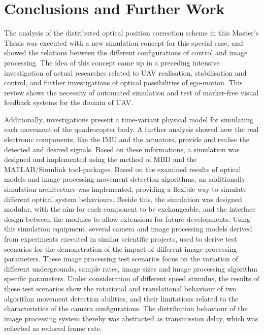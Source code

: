 \chapter{Conclusions and Further Work}
\label{mt:c:conclusions}

The analysis of the distributed optical position correction scheme in this Master's Thesis was executed with a new simulation concept for this special case, and showed the relations between the different configurations of control and image processing. The idea of this concept came up in a preceding intensive investigation of actual researches related to \gls{UAV} realisation, stabilisation and control, and further investigations of optical possibilities of ego-motion. This review shows the necessity of automated simulation and test of marker-free visual feedback systems for the domain of \gls{UAV}. 

Additionally, investigations present a time-variant physical model for simulating each movement of the quadrocopter body. A further analysis showed how the real electronic components, like the \gls{IMU} and the actuators, provide and realise the detected and desired signals. Based on these informations, a simulation was designed and implemented using the method of \gls{MBD} and the MATLAB/Simulink tool-packages. Based on the examined results of optical models and image processing movement detection algorithms, an additionally simulation architecture was implemented, providing a flexible way to simulate different optical system behaviours.
\newpage
Beside this, the simulation was designed modular, with the aim for each component to be exchangeable, and the interface design between the modules to allow extensions for future developments. Using this simulation equipment, several camera and image processing models derived from experiments executed in similar scientific projects, used to derive test scenarios for the demonstration of the impact of different image processing parameters. These image processing test scenarios focus on the variation of different undergrounds, sample rates, image sizes and image processing algorithm specific parameters. Under consideration of different speed stimulus, the results of these test scenarios show the rotational and translational behaviour of two algorithm movement detection abilities, and their limitations related to the characteristics of the camera configurations. The distribution behaviour of the image processing system thereby was abstracted as transmission delay, which was reflected as reduced frame rate. 
 
